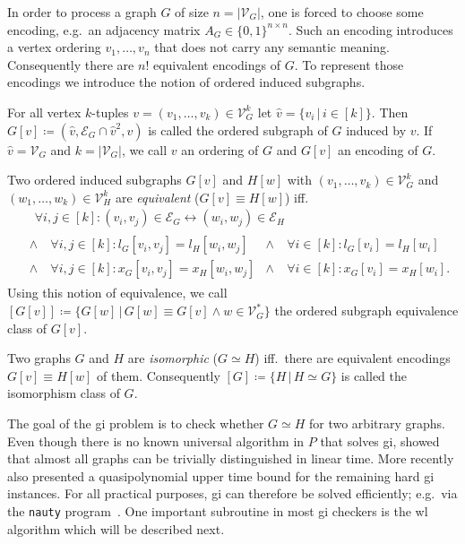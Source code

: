 In order to process a graph $G$ of size $n = |\mathcal{V}_G|$, one is forced to choose some encoding, e.g.\ an adjacency matrix $A_G \in {\{0, 1\}}^{n \times n}$.
Such an encoding introduces a vertex ordering $v_1, \dots, v_n$ that does not carry any semantic meaning.
Consequently there are $n!$ equivalent encodings of $G$. %
To represent those encodings we introduce the notion of ordered induced subgraphs.
\begin{defn}\label{defn:related:ordered-subgraph}
	For all vertex $k$-tuples $v = (v_1, \dots, v_k) \in \mathcal{V}_G^k$ let $\hat{v} = \{ v_i\, |\, i \in [k] \}$.
	Then $G[v] \coloneqq (\hat{v}, \mathcal{E}_G \cap \hat{v}^2, v)$ is called the ordered subgraph of $G$ induced by $v$.
	If $\hat{v} = \mathcal{V}_G$ and $k = |\mathcal{V}_G|$, we call $v$ an ordering of $G$ and $G[v]$ an encoding of $G$.
\end{defn}
\begin{defn}\label{defn:related:ordered-subgraph-equivalence}
	Two ordered induced subgraphs $G[v]$ and $H[w]$ with $(v_1, \dots, v_k) \in \mathcal{V}_G^k$ and $(w_1, \dots, w_k) \in \mathcal{V}_H^k$ are \textit{equivalent} ($G[v] \equiv H[w]$) iff.\
	\begin{align*}
		&\quad\forall i, j \in [k]: (v_i, v_j) \in \mathcal{E}_G \leftrightarrow (w_i, w_j) \in \mathcal{E}_H \\
		&\, \begin{aligned}
			\land&\ \forall i, j \in [k]: l_G[v_i, v_j] = l_H[w_i, w_j] &\land&\ \forall i \in [k]: l_G[v_i] = l_H[w_i] \\
			\land&\ \forall i, j \in [k]: x_G[v_i, v_j] = x_H[w_i, w_j] &\land&\ \forall i \in [k]: x_G[v_i] = x_H[w_i]\text{.}
		\end{aligned}
	\end{align*}
	Using this notion of equivalence, we call $[G[v]] \coloneqq \{ G[w]\, |\, G[w] \equiv G[v] \land w \in \mathcal{V}_G^{*} \}$ the ordered subgraph equivalence class of $G[v]$.
\end{defn}
\begin{defn}
	Two graphs $G$ and $H$ are \textit{isomorphic} ($G \simeq H$) iff.\ there are equivalent encodings $G[v] \equiv H[w]$ of them.
	Consequently $[G] \coloneqq \{ H\, |\, H \simeq G \}$ is called the isomorphism class of $G$.
\end{defn}
The goal of the \ac{gi} problem is to check whether $G \simeq H$ for two arbitrary graphs.
Even though there is no known universal algorithm in $P$ that solves \ac{gi}, \citet{Babai1980} showed that almost all graphs can be trivially distinguished in linear time.
More recently \citet{Babai2015} also presented a quasipolynomial upper time bound for the remaining hard \ac{gi} instances.
For all practical purposes, \ac{gi} can therefore be solved efficiently; e.g.\ via the \texttt{nauty} program~\cite{McKay}\cite{McKay2013}.
One important subroutine in most \ac{gi} checkers is the \acl{wl} algorithm which will be described next.


